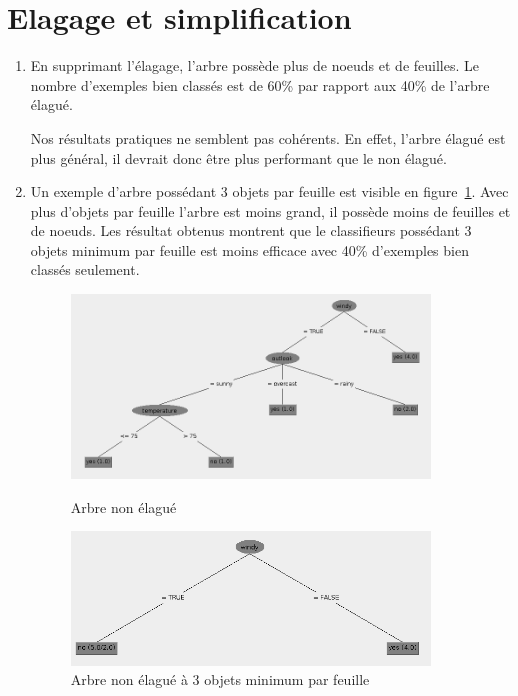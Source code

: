 \documentclass[a4paper]{article}
\begin{document}
\section{Elagage et simplification}

\begin{enumerate}
\item En supprimant l'élagage, l'arbre possède plus de noeuds et de feuilles.
Le nombre d'exemples bien classés est de 60\% par rapport aux 40\% de l'arbre élagué. 

Nos résultats pratiques ne semblent pas cohérents. En effet, l'arbre élagué est plus général, il devrait donc être plus performant que le non élagué.

\item Un exemple d'arbre possédant 3 objets par feuille est visible en figure~\ref{fig:ArbreSeuilNonElag}. Avec plus d'objets par feuille l'arbre est moins grand, il possède moins de feuilles et de noeuds. Les résultat obtenus montrent que le classifieurs possédant 3 objets minimum par feuille est moins efficace avec 40\% d'exemples bien classés seulement.

    
\begin{figure}[h]
  \begin{center}
    \begin{minipage}[t]{0.48\textwidth}
		\includegraphics[width=0.9\textwidth]{ArbreNonElage.png}
	    \caption{Arbre non élagué}
	    \label{fig:ArbreSeuil} 
    \end{minipage}
    \hfill
    \begin{minipage}[t]{0.48\textwidth}
		\includegraphics[width=0.9\textwidth]{ArbreNonElage3Obj.png}
	    \caption{Arbre non élagué à 3 objets minimum par feuille}
	    \label{fig:ArbreSeuilNonElag}
    \end{minipage}
  \end{center}
\end{figure}


\end{enumerate}
\end{document}
